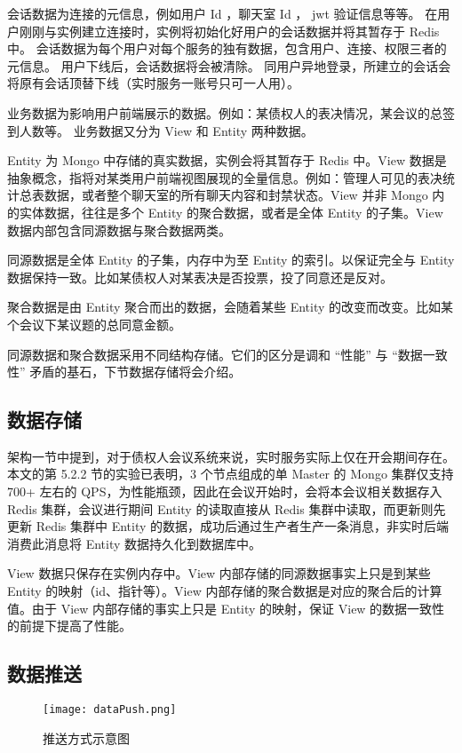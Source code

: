 会话数据为连接的元信息，例如用户 Id ，聊天室 Id ， jwt 验证信息等等。
在用户刚刚与实例建立连接时，实例将初始化好用户的会话数据并将其暂存于 Redis 中。
会话数据为每个用户对每个服务的独有数据，包含用户、连接、权限三者的元信息。
用户下线后，会话数据将会被清除。
同用户异地登录，所建立的会话会将原有会话顶替下线（实时服务一账号只可一人用）。

业务数据为影响用户前端展示的数据。例如：某债权人的表决情况，某会议的总签到人数等。
业务数据又分为 View 和 Entity 两种数据。

Entity 为 Mongo 中存储的真实数据，实例会将其暂存于 Redis 中。View 数据是抽象概念，指将对某类用户前端视图展现的全量信息。例如：管理人可见的表决统计总表数据，或者整个聊天室的所有聊天内容和封禁状态。View 并非 Mongo 内的实体数据，往往是多个 Entity 的聚合数据，或者是全体 Entity 的子集。View 数据内部包含同源数据与聚合数据两类。

同源数据是全体 Entity 的子集，内存中为至 Entity 的索引。以保证完全与 Entity 数据保持一致。比如某债权人对某表决是否投票，投了同意还是反对。

聚合数据是由 Entity 聚合而出的数据，会随着某些 Entity 的改变而改变。比如某个会议下某议题的总同意金额。

同源数据和聚合数据采用不同结构存储。它们的区分是调和 “性能” 与 “数据一致性” 矛盾的基石，下节数据存储将会介绍。

\subsection{数据存储}

架构一节中提到，对于债权人会议系统来说，实时服务实际上仅在开会期间存在。本文的第 5.2.2 节的实验已表明，3 个节点组成的单 Master 的 Mongo 集群仅支持 700+ 左右的 QPS，为性能瓶颈，因此在会议开始时，会将本会议相关数据存入 Redis 集群，会议进行期间 Entity 的读取直接从 Redis 集群中读取，而更新则先更新 Redis 集群中 Entity 的数据，成功后通过生产者生产一条消息，非实时后端消费此消息将 Entity 数据持久化到数据库中。

View 数据只保存在实例内存中。View 内部存储的同源数据事实上只是到某些 Entity 的映射（id、指针等）。View 内部存储的聚合数据是对应的聚合后的计算值。由于 View 内部存储的事实上只是 Entity 的映射，保证 View 的数据一致性的前提下提高了性能。

\subsection{数据推送}

\begin{figure}[!htp]
  \centering
  \texttt{[image: dataPush.png]}
  \caption[推送方式]
    {推送方式示意图}
 \label{fig:dataPush}
\end{figure}

